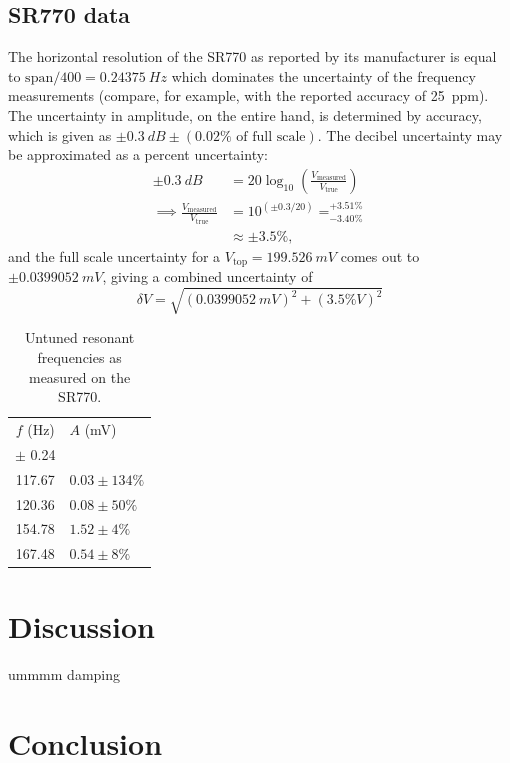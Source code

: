 \documentclass{article}
\begin{document}
\subsection{SR770 data}
The horizontal resolution of the SR770 as reported by its manufacturer is equal to $\text{span}/400=\qty{0.24375}{Hz}$ which dominates the uncertainty of the frequency measurements (compare, for example, with the reported accuracy of \qty{25}{ppm}). The uncertainty in amplitude, on the entire hand, is determined by accuracy, which is given as $\pm\qty{0.3}{dB}\pm (0.02\%\text{ of full scale})$. The decibel uncertainty may be approximated as a percent uncertainty:
\begin{equation*}
	\begin{aligned}
		\pm\qty{0.3}{dB} &= 20 \log_{10}\left( \frac{V_\text{measured}}{V_\text{true}} \right) \\
		\implies \frac{V_\text{measured}}{V_\text{true}} &= 10^{(\pm0.3/20)} = ^{+3.51\%}_{-3.40\%}\\
		 &\approx \pm 3.5\%,
	\end{aligned}
\end{equation*}
and the full scale uncertainty for a $V_\text{top}=\qty{199.526}{mV}$ comes out to $\pm \qty{0.0399052}{mV}$, giving a combined uncertainty of 
\begin{equation*}
	\delta V = \sqrt{\left( \qty{0.0399052}{mV} \right)^2 + \left( 3.5\% V \right)^2}
\end{equation*}

\begin{table}
  \centering
  \caption{Untuned resonant frequencies as measured on the SR770.}
  \begin{tabular}{@{}cl@{}}
    \toprule
    $f$ (\unit{Hz}) & $A$ (\unit{mV}) \\
	$\pm$ 0.24 & \\
    \midrule
    117.67 & $0.03 \pm 134\%$ \\
	120.36 & $0.08 \pm 50\%$ \\
	154.78 & $1.52 \pm 4\%$ \\
	167.48 & $0.54 \pm 8\%$ \\
    \bottomrule
  \end{tabular}
  \label{tab:sr770res}
\end{table}

\section{Discussion}

ummmm damping

\section{Conclusion}
\end{document}

